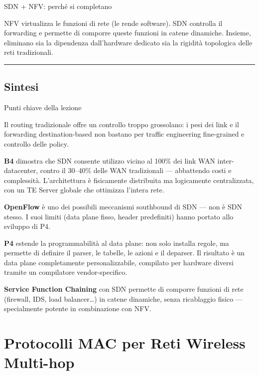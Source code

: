 \documentclass[
  italian,
  openany]{book}
\begin{document}
\begin{callouttip}{SDN + NFV: perché si completano}

NFV virtualizza le funzioni di rete (le rende software). SDN controlla
il forwarding e permette di comporre queste funzioni in catene
dinamiche. Insieme, eliminano sia la dipendenza dall'hardware dedicato
sia la rigidità topologica delle reti tradizionali.

\end{callouttip}

\begin{center}\rule{0.5\linewidth}{0.5pt}\end{center}

\section{Sintesi}\label{sintesi}

\begin{calloutnote}{Punti chiave della lezione}

Il routing tradizionale offre un controllo troppo grossolano: i pesi dei
link e il forwarding destination-based non bastano per traffic
engineering fine-grained e controllo delle policy.

\textbf{B4} dimostra che SDN consente utilizzo vicino al 100\% dei link
WAN inter-datacenter, contro il 30--40\% delle WAN tradizionali ---
abbattendo costi e complessità. L'architettura è fisicamente distribuita
ma logicamente centralizzata, con un TE Server globale che ottimizza
l'intera rete.

\textbf{OpenFlow} è uno dei possibili meccanismi southbound di SDN ---
non è SDN stesso. I suoi limiti (data plane fisso, header predefiniti)
hanno portato allo sviluppo di P4.

\textbf{P4} estende la programmabilità al data plane: non solo installa
regole, ma permette di definire il parser, le tabelle, le azioni e il
deparser. Il risultato è un data plane completamente personalizzabile,
compilato per hardware diversi tramite un compilatore vendor-specifico.

\textbf{Service Function Chaining} con SDN permette di comporre funzioni
di rete (firewall, IDS, load balancer\ldots) in catene dinamiche, senza
ricablaggio fisico --- specialmente potente in combinazione con NFV.

\end{calloutnote}

\newpage

\chapter{Protocolli MAC per Reti Wireless
Multi-hop}\label{protocolli-mac-per-reti-wireless-multi-hop}
\end{document}
